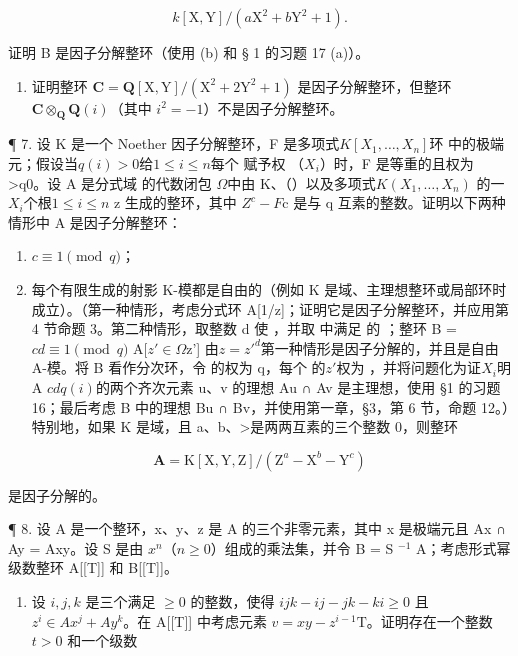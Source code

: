 \[
k [ \mathrm{X}, \mathrm{Y} ] / (a \mathrm{X} ^ {2} + b \mathrm{Y} ^ {2} + 1).
\]

证明 B 是因子分解整环（使用 (b) 和 § 1 的习题 17 (a)）。

\begin{enumerate}
\def\labelenumi{(\alph{enumi})}
\setcounter{enumi}{3}
\tightlist
\item
  证明整环 \(\mathbf{C} = \mathbf{Q}[\mathrm{X},\mathrm{Y}] / (\mathrm{X}^2 +2\mathrm{Y}^2 +1)\) 是因子分解整环，但整环 \(\mathbf{C}\otimes_{\mathbf{Q}}\mathbf{Q}(i)\)（其中 \(i^2 = -1\)）不是因子分解整环。
\end{enumerate}

¶ 7. 设 K 是一个 Noether 因子分解整环，F 是多项式\(K[X_{1},\ldots,X_{n}]\)环  中的极端元；假设当\(q(i)>0\)给\(1\leqslant i\leqslant n\)每个  赋予权 （\(X_{i}\)）时，F 是等重的且权为\textgreater q0。设 A 是分式域  的代数闭包  \(\Omega\)中由 K、（）以及多项式\(K(X_{1},\ldots,X_{n})\)  的一\(X_{i}\)个根\(1\leqslant i\leqslant n\) z 生成的整环，其中 \(Z^{c}-F\)c 是与 q 互素的整数。证明以下两种情形中 A 是因子分解整环：

\begin{enumerate}
\def\labelenumi{(\arabic{enumi})}
\item
  \(c \equiv 1 \pmod{q}\)；
\item
  每个有限生成的射影 K-模都是自由的（例如 K 是域、主理想整环或局部环时成立）。（第一种情形，考虑分式环 A[1/z]；证明它是因子分解整环{}，{并}应用第 4 节命题 3。第二种情形，取整数 d 使 ，并取  中满足  的 ；整环 B =\(cd \equiv 1 \pmod{q}\) A[\(z' \in \Omega\)z'] 由\(z = z'^{d}\)第一种情形是因{}子{}分解的，并且是自由 A-模。将 B 看作分次环，令  的权为 q，每个  的\(z'\)权为 ，并将问题化为证\(X_{i}\)明 A \(cdq(i)\)的两个齐次元素 u、v 的理想 Au ∩ Av 是主理想，使用 §1 的习题 16；最后考虑 B 中的理想 Bu ∩ Bv，并使用第一章，§3，第 6 节，命题 12。）特别地，如果 K 是域，且 a、b、\textgreater 是两两互素的三个整数 0，则整环
\end{enumerate}

\[
\mathbf {A} = \mathrm{K} [ \mathrm{X}, \mathrm{Y}, \mathrm{Z} ] / (\mathrm{Z} ^ {a} - \mathrm{X} ^ {b} - \mathrm{Y} ^ {c})
\]

是因子分解的。

¶ 8. 设 A 是一个整环，x、y、z 是 A 的三个非零元素，其中 x 是极端元且 Ax ∩ Ay = Axy。设 S 是由 \(x^{n}\)（\(n \geqslant 0\)）组成的乘法集，并令 B = S \(^{-1}\) A；考虑形式幂级数整环 A{[}{[}T{]}{]} 和 B{[}{[}T{]}{]}。

\begin{enumerate}
\def\labelenumi{(\alph{enumi})}
\tightlist
\item
    设 \(i, j, k\) 是三个满足 \(\geqslant 0\) 的整数，使得 \(ijk - ij - jk - ki \geqslant 0\) 且 \(z^i \in Ax^j + Ay^k\)。在 A{[}{[}T{]}{]} 中考虑元素 \(v = xy - z^{i-1}\mathrm{T}\)。证明存在一个整数 \(t > 0\) 和一个级数
\end{enumerate}

